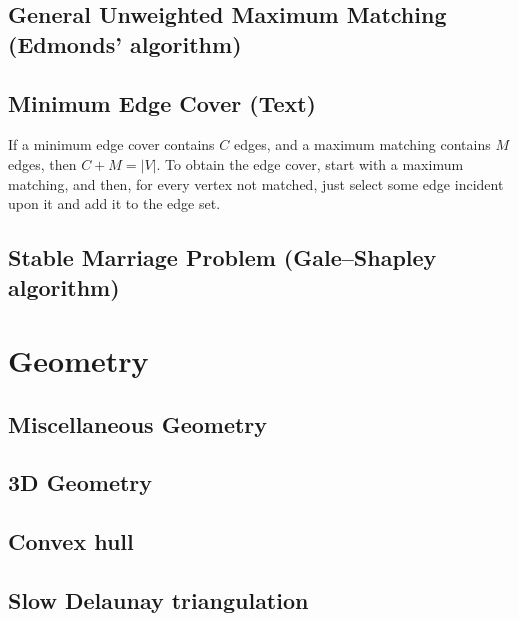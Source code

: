 \documentclass[10pt]{extarticle}
\begin{document}
\begin{multicols*}{3}
\subsection{General Unweighted Maximum Matching (Edmonds' algorithm)}


\subsection{Minimum Edge Cover (Text)} %
If a minimum edge cover contains $C$ edges, and a maximum matching contains $M$
edges, then $C + M = |V|$. To obtain the edge cover, start with a maximum
matching, and then, for every vertex not matched, just select some edge
incident upon it and add it to the edge set. 

\subsection{Stable Marriage Problem (Gale--Shapley algorithm)} %


\section{Geometry}

\subsection{Miscellaneous Geometry} %


\subsection{3D Geometry}


\subsection{Convex hull} %


\subsection{Slow Delaunay triangulation} %



\end{multicols*}
\end{document}
